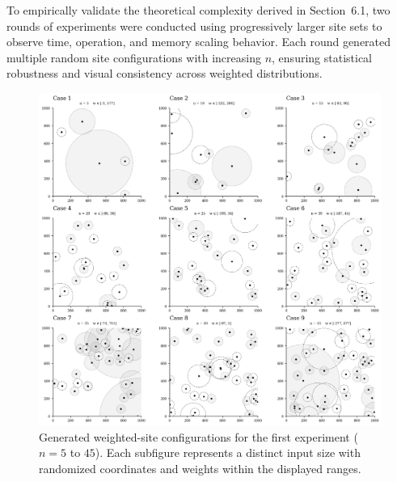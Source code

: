 \documentclass{article}
\begin{document}

To empirically validate the theoretical complexity derived in Section~6.1, two rounds of experiments were conducted using progressively larger site sets to observe time, operation, and memory scaling behavior.  
Each round generated multiple random site configurations with increasing $n$, ensuring statistical robustness and visual consistency across weighted distributions.

\begin{figure}[H]
    \centering
    \includegraphics[width=0.95\linewidth]{Pictures/test_sites1.png}
    \caption{Generated weighted-site configurations for the first experiment ($n=5$ to $45$). 
    Each subfigure represents a distinct input size with randomized coordinates and weights within the displayed ranges.}
    \label{fig:test_sites1}
\end{figure}
\end{document}
